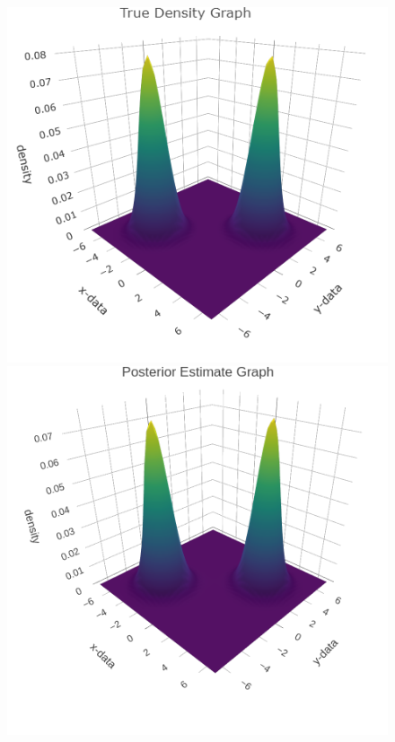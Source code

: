 \begin{figure}[h]
\begin{multicols}{2}
    \includegraphics[width=\linewidth]{etc/true_density.png}\par 
    \includegraphics[width=\linewidth]{etc/test5_dens.png}\par 

\end{multicols}
\end{figure}
